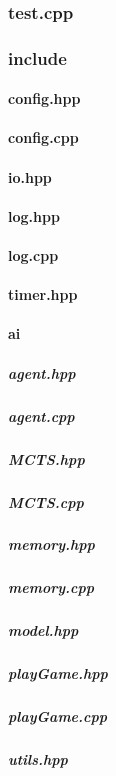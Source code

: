 \documentclass[12pt]{article}
\newcommand{\incFile}[2]{\label{code:#2}\newpage}
\begin{document}
\subsubsection{test.cpp}												\incFile{C++}{AlphaZeroPytorch/test.cpp}

\subsubsection{include}													%
\paragraph{config.hpp}													\incFile{C++}{AlphaZeroPytorch/include/config.hpp} \label{code:config}
\paragraph{config.cpp}													\incFile{C++}{AlphaZeroPytorch/include/config.cpp}
\paragraph{io.hpp}															\incFile{C++}{AlphaZeroPytorch/include/io.hpp}
\paragraph{log.hpp}														\incFile{C++}{AlphaZeroPytorch/include/log.hpp}
\paragraph{log.cpp}														\incFile{C++}{AlphaZeroPytorch/include/log.cpp}
\paragraph{timer.hpp}													\incFile{C++}{AlphaZeroPytorch/include/timer.hpp}

\paragraph{ai}																	%
\subparagraph{agent.hpp}												\incFile{C++}{AlphaZeroPytorch/include/ai/agent.hpp} \label{code:Agent}
\subparagraph{agent.cpp}												\incFile{C++}{AlphaZeroPytorch/include/ai/agent.cpp}
\subparagraph{MCTS.hpp}												\incFile{C++}{AlphaZeroPytorch/include/ai/MCTS.hpp}
\subparagraph{MCTS.cpp}												\incFile{C++}{AlphaZeroPytorch/include/ai/MCTS.cpp}
\subparagraph{memory.hpp}											\incFile{C++}{AlphaZeroPytorch/include/ai/memory.hpp}
\subparagraph{memory.cpp}											\incFile{C++}{AlphaZeroPytorch/include/ai/memory.cpp}
\subparagraph{model.hpp}											\incFile{C++}{AlphaZeroPytorch/include/ai/model.hpp}
\subparagraph{playGame.hpp}										\incFile{C++}{AlphaZeroPytorch/include/ai/playGame.hpp}\label{code:playGame}
\subparagraph{playGame.cpp}										\incFile{C++}{AlphaZeroPytorch/include/ai/playGame.cpp}
\subparagraph{utils.hpp}												\incFile{C++}{AlphaZeroPytorch/include/ai/utils.hpp}
\end{document}
